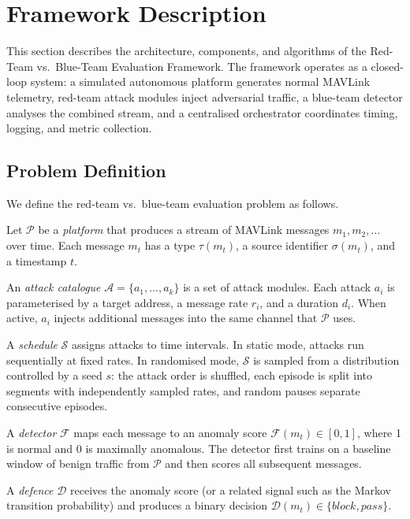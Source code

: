 \section{Framework Description} \label{sec:framework}

This section describes the architecture, components, and algorithms of the Red-Team vs.\ Blue-Team Evaluation Framework.
The framework operates as a closed-loop system: a simulated autonomous platform generates normal MAVLink telemetry, red-team attack modules inject adversarial traffic, a blue-team detector analyses the combined stream, and a centralised orchestrator coordinates timing, logging, and metric collection.

\subsection{Problem Definition}

We define the red-team vs.\ blue-team evaluation problem as follows.

Let $\mathcal{P}$ be a \emph{platform} that produces a stream of MAVLink messages $m_1, m_2, \dots$ over time.
Each message $m_t$ has a type $\tau(m_t)$, a source identifier $\sigma(m_t)$, and a timestamp $t$.

An \emph{attack catalogue} $\mathcal{A} = \{a_1, \dots, a_k\}$ is a set of attack modules.
Each attack $a_i$ is parameterised by a target address, a message rate $r_i$, and a duration $d_i$.
When active, $a_i$ injects additional messages into the same channel that $\mathcal{P}$ uses.

A \emph{schedule} $\mathcal{S}$ assigns attacks to time intervals.
In static mode, attacks run sequentially at fixed rates.
In randomised mode, $\mathcal{S}$ is sampled from a distribution controlled by a seed $s$: the attack order is shuffled, each episode is split into segments with independently sampled rates, and random pauses separate consecutive episodes.

A \emph{detector} $\mathcal{F}$ maps each message to an anomaly score $\mathcal{F}(m_t) \in [0, 1]$, where 1 is normal and 0 is maximally anomalous.
The detector first trains on a baseline window of benign traffic from $\mathcal{P}$ and then scores all subsequent messages.

A \emph{defence} $\mathcal{D}$ receives the anomaly score (or a related signal such as the Markov transition probability) and produces a binary decision $\mathcal{D}(m_t) \in \{\textit{block}, \textit{pass}\}$.

